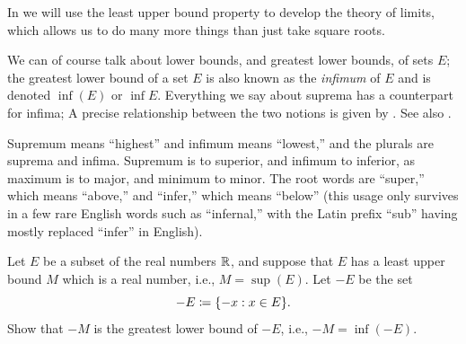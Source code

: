 \begin{rmk}\label{i:5.5.14}
  In  we will use the least upper bound property to develop the theory of limits, which allows us to do many more things than just take square roots.
\end{rmk}

\begin{rmk}\label{i:5.5.15}
  We can of course talk about lower bounds, and greatest lower bounds, of sets \(E\);
  the greatest lower bound of a set \(E\) is also known as the \emph{infimum} of \(E\) and is denoted \(\inf(E)\) or \(\inf E\).
  Everything we say about suprema has a counterpart for infima;
  A precise relationship between the two notions is given by .
  See also .
\end{rmk}

\begin{note}
  Supremum means ``highest'' and infimum means ``lowest,'' and the plurals are suprema and infima.
  Supremum is to superior, and infimum to inferior, as maximum is to major, and minimum to minor.
  The root words are ``super,'' which means ``above,'' and ``infer,'' which means ``below''
  (this usage only survives in a few rare English words such as ``infernal,'' with the Latin prefix ``sub'' having mostly replaced ``infer'' in English).
\end{note}

\exercisesection

\begin{ex}\label{i:ex:5.5.1}
  Let \(E\) be a subset of the real numbers \(\mathbb{R}\), and suppose that \(E\) has a least upper bound \(M\) which is a real number, i.e., \(M = \sup(E)\).
  Let \(-E\) be the set
  \[
    -E \coloneqq \set{-x : x \in E}.
  \]
  Show that \(-M\) is the greatest lower bound of \(-E\), i.e., \(-M = \inf(-E)\).
\end{ex}

